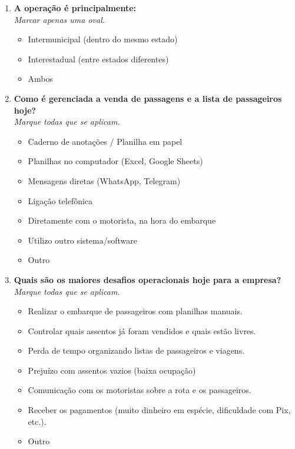 \begin{apendicesenv}
\begin{enumerate}
    \item \textbf{A operação é principalmente:} \\
          \textit{Marcar apenas uma oval.}
          \begin{itemize}
            \item Intermunicipal (dentro do mesmo estado)
            \item Interestadual (entre estados diferentes)
            \item Ambos
          \end{itemize}

    \item \textbf{Como é gerenciada a venda de passagens e a lista de passageiros hoje?} \\
          \textit{Marque todas que se aplicam.}
          \begin{itemize}
            \item Caderno de anotações / Planilha em papel
            \item Planilhas no computador (Excel, Google Sheets)
            \item Mensagens diretas (WhatsApp, Telegram)
            \item Ligação telefônica
            \item Diretamente com o motorista, na hora do embarque
            \item Utilizo outro sistema/software
            \item Outro
          \end{itemize}

    \item \textbf{Quais são os maiores desafios operacionais hoje para a empresa?} \\
          \textit{Marque todas que se aplicam.}
          \begin{itemize}
            \item Realizar o embarque de passageiros com planilhas manuais.
            \item Controlar quais assentos já foram vendidos e quais estão livres.
            \item Perda de tempo organizando listas de passageiros e viagens.
            \item Prejuízo com assentos vazios (baixa ocupação)
            \item Comunicação com os motoristas sobre a rota e os passageiros.
            \item Receber os pagamentos (muito dinheiro em espécie, dificuldade com Pix, etc.).
            \item Outro
          \end{itemize}


\end{enumerate}
\end{apendicesenv}
